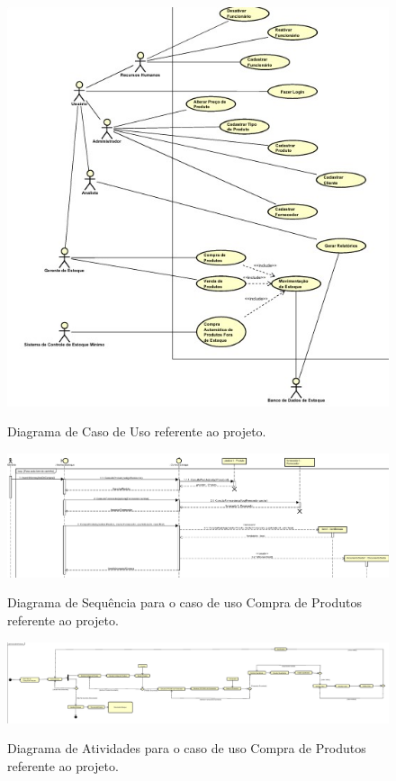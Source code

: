 \documentclass[12pt]{article}
\begin{document}
    \begin{figure}
        \centering
        \caption{Diagrama de Caso de Uso referente ao projeto.}
        \includegraphics[width=0.8\linewidth]{figures/diagramaUC.png}
        \label{fig:figura3}
    \end{figure}
    
    \begin{figure}
        \centering
        \caption{Diagrama de Sequência para o caso de uso Compra de Produtos referente ao projeto.}
        \includegraphics[width=0.8\linewidth]{figures/diagramaSequencia.png}
        \label{fig:figura4}
    \end{figure}
 
    \begin{figure}
        \centering
        \caption{Diagrama de Atividades para o caso de uso Compra de Produtos referente ao projeto.}
        \includegraphics[width=0.8\linewidth]{figures/diagramaAtividades.png}
        \label{fig:figura5}
    \end{figure}
 
\end{document}
